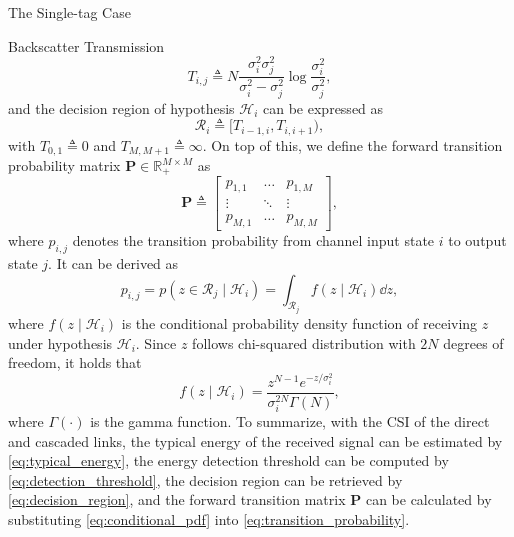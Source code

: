\documentclass[journal]{IEEEtran}
\begin{document}
\begin{section}{The Single-tag Case}
\begin{subsection}{Backscatter Transmission}
\begin{equation}
				T_{i,j} \triangleq N \frac{\sigma_i^2 \sigma_j^2}{\sigma_i^2 - \sigma_j^2} \log \frac{\sigma_i^2}{\sigma_j^2},
				\label{eq:detection_threshold}
			\end{equation}
			and the decision region of hypothesis $\mathcal{H}_i$ can be expressed as
			\begin{equation}
				\mathcal{R}_i \triangleq [T_{i-1, i}, T_{i, i+1}),
				\label{eq:decision_region}
			\end{equation}
			with $T_{0, 1} \triangleq 0$ and $T_{M, M+1} \triangleq \infty$. On top of this, we define the forward transition probability matrix $\boldsymbol{P} \in \mathbb{R}_{+}^{M \times M}$ as
			\begin{equation}
				\boldsymbol{P} \triangleq
				\begin{bmatrix}
					p_{1, 1} & \ldots & p_{1, M} \\
					\vdots & \ddots & \vdots \\
					p_{M, 1} & \ldots & p_{M, M}
				\end{bmatrix},
			\end{equation}
			where $p_{i,j}$ denotes the transition probability from channel input state $i$ to output state $j$. It can be derived as
			\begin{equation}
				p_{i,j} = p(z \in \mathcal{R}_j \mid \mathcal{H}_i) = \int_{\mathcal{R}_j} f(z \mid \mathcal{H}_i) \dd z,
				\label{eq:transition_probability}
			\end{equation}
			where $f(z \mid \mathcal{H}_i)$ is the conditional probability density function of receiving $z$ under hypothesis $\mathcal{H}_i$. Since $z$ follows chi-squared distribution with $2N$ degrees of freedom, it holds that
			\begin{equation}
				f(z \mid \mathcal{H}_i) = \frac{z^{N-1} e^{-z/\sigma_i^2}}{\sigma_i^{2N} \Gamma(N)},
				\label{eq:conditional_pdf}
			\end{equation}
			where $\Gamma(\cdot)$ is the gamma function. To summarize, with the CSI of the direct and cascaded links, the typical energy of the received signal can be estimated by \eqref{eq:typical_energy}, the energy detection threshold can be computed by \eqref{eq:detection_threshold}, the decision region can be retrieved by \eqref{eq:decision_region}, and the forward transition matrix $\boldsymbol{P}$ can be calculated by substituting \eqref{eq:conditional_pdf} into \eqref{eq:transition_probability}.


\end{subsection}
\end{section}
\end{document}
